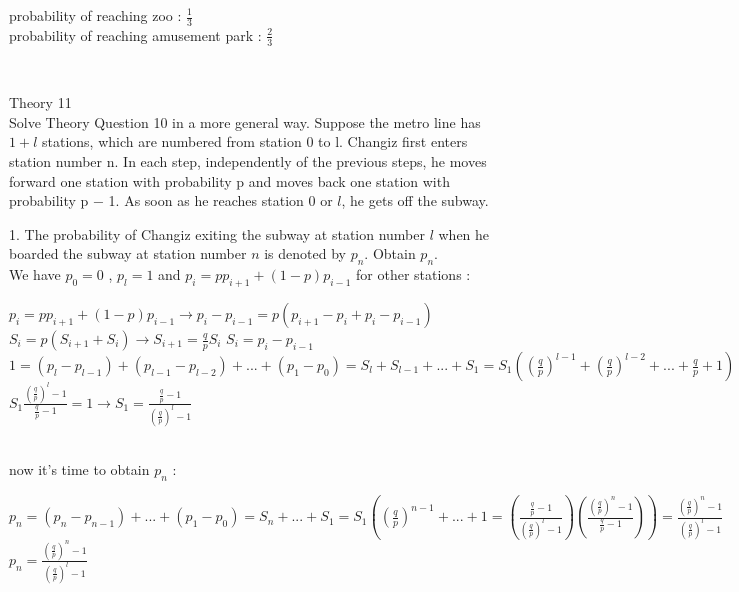 \documentclass[30pt]{article}
\begin{document}
\begin{center}
    probability of reaching zoo : \hspace{0.2cm} $\frac{1}{3}$ \\
    probability of reaching amusement park : \hspace{0.2cm} $\frac{2}{3}$
\end{center} \\ \newline 


{\Large \color{blue} Theory 11 } \\
{\color{blue} Solve {\color{red}Theory Question 10} in a more general way. Suppose the metro line has $1 + l$ stations, which are numbered from station 0 to l. Changiz first enters station number n. In each step, independently of the previous steps, he moves forward one station with probability p and moves back one station with probability p − 1. As soon as he reaches station 0 or $l$, he gets off the subway. } \\ \newline 

{\color{blue} {\large 1. }The probability of Changiz exiting the subway at station number $l$ when he boarded the subway at station number $n$ is denoted by $p_n$. Obtain $p_n$. } \\ \newline
We have $p_0 = 0 $ , $p_l = 1 $ and $ p_i = pp_{i+1} + (1-p)p_{i-1} $ for other stations : \\
\begin{center}
    $p_i = pp_{i+1} + (1-p)p_{i-1} \rightarrow p_i - p_{i-1} = p(p_{i+1} - p_i + p_i - p_{i-1}) $ \vspace{0.2cm} \\
    $S_i = p(S_{i+1} + S_{i}) \rightarrow S_{i+1} = \frac{q}{p}S_i $ \hspace{1cm} $S_i = p_i - p_{i-1} $ \hspace{0.2cm} \\
    $1 = (p_l - p_{l-1}) + (p_{l-1} - p_{l-2}) + ... + (p_1 - p_0) = S_l + S_{l-1} + ... + S_1 = S_1((\frac{q}{p})^{l-1} + (\frac{q}{p})^{l-2} + ... + \frac{q}{p} + 1 ) $ \hspace{0.2cm} \\
    $S_1 \frac{(\frac{q}{p})^l - 1}{\frac{q}{p} - 1} = 1  \rightarrow S_1 = \frac{\frac{q}{p} - 1}{(\frac{q}{p})^l - 1} $
\end{center} \\
now it's time to obtain $p_n $ : \\
\begin{center}
    $p_n = (p_n - p_{n-1}) + ... + (p_1 - p_0) = S_n + ... + S_1 = S_1((\frac{q}{p})^{n-1} + ... + 1 = (\frac{\frac{q}{p} - 1}{(\frac{q}{p})^l - 1})(\frac{(\frac{q}{p})^n - 1}{\frac{q}{p} - 1})) = \frac{(\frac{q}{p})^n - 1}{(\frac{q}{p})^l - 1} $ \vspace{0.25cm} \\ 
    $p_n = \frac{(\frac{q}{p})^n - 1}{(\frac{q}{p})^l - 1} $
\end{center} \\ \newline 
\end{document}
